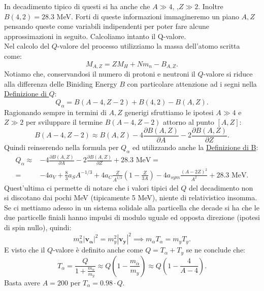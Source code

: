 In decadimento tipico di questi si ha anche che $A\gg 4$, ,$Z\gg 2$. Inoltre $B\left( 4,2 \right) = 28.3$ MeV. Forti di queste informazioni immagineremo un piano $A,Z$ pensando queste come variabili indipendenti per poter fare alcune approssimazioni in seguito. Calcoliamo intanto il Q-valore.\\
Nel calcolo del $Q$-valore del processo utilizziamo la massa dell'atomo scritta come:
\[
M_{A,Z} = ZM_H + N m_n - B_{A,Z} 
.\] 
Notiamo che, conservandosi il numero di protoni e neutroni il $Q$-valore si riduce alla differenza delle Biniding Energy $B$ con particolare attenzione ad i segni nella \hyperref[eq:Q-valore]{Definizione di $Q$}:
 \[
	 Q_{\alpha} = B\left( A-4,Z-2 \right) + B\left( 4,2 \right) - B\left( A,Z \right) 
.\] 
Ragionando sempre in termini di $A,Z$ generigi sfruttiamo le ipotesi $A\gg 4$ e $Z\gg 2$ per sviluppare il termine $B\left( A-4,Z-2 \right) $ attorno al punto $\left[ A , Z \right]$:
\[
	B\left( A-4,Z-2 \right) \approx B\left( A, Z \right) - 4 \frac{\partial B\left( A,Z \right)}{\partial A}-2\frac{\partial B\left( A,Z \right) }{\partial Z}   
.\] 
Quindi reinserendo nella formula per $Q_{\alpha}$ ed utilizzando anche la \hyperref[eq:B-energy]{Definizione di B}:
\begin{align*}
	Q_{\alpha} \approx& - 4 \frac{\partial B\left( A,Z \right)}{\partial A}-2\frac{\partial B\left( A,Z \right) }{\partial Z} + 28.3 \text{ MeV} =\\
	=& -4a_V + \frac{8}{3} a_S A^{-1 /3} +4 a_C \frac{Z}{A^{1 /3}}\left( 1- \frac{Z}{3A} \right) - 4a_{sym} \frac{\left( A-2Z \right)^2 }{A^2} + 28.3 \text{ MeV} 
.\end{align*}
Quest'ultima ci permette di notare che i valori tipici del $Q$ del decadimento non si discotano dai pochi MeV (tipicamente 5 MeV), niente di relativistico insomma.\\
Se ci mettiamo adesso in un sistema solidale alla particella che decade si ha che le due particelle finiali hanno impulsi di modulo uguale ed opposta direzione (ipotesi di spin nullo), quindi:
\[
m_{\alpha}^2 \left| \boldsymbol{v_{\alpha}} \right|^2 = m_{y}^2 \left| \boldsymbol{v_{y}} \right|^2 \implies m_{\alpha} T_{\alpha} = m_{y}T_{y}
.\]
E visto che il $Q$-valore è definito anche come  $Q = T_{\alpha} + T_{y}$ se ne conclude che:
\[
	T_{\alpha} = \frac{Q}{1 + \frac{m_{\alpha}}{m_{y}}} \approx Q\left( 1-\frac{m_{\alpha}}{m_y} \right) \approx Q\left( 1-\frac{4}{A-4} \right) 
.\] 
Basta avere $A = 200$ per  $T_{\alpha} = 0.98\cdot Q$. \\
